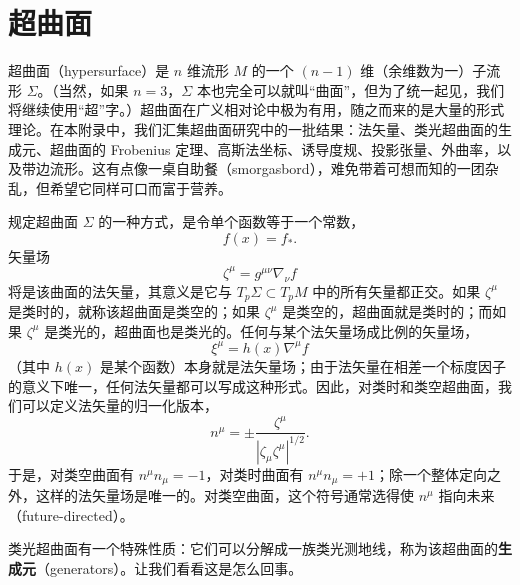 \chapter{超曲面}

超曲面（hypersurface）是 $n$ 维流形 $M$ 的一个 $(n-1)$ 维（余维数为一）子流形 $\Sigma$。（当然，如果 $n = 3$，$\Sigma$ 本也完全可以就叫“曲面”，但为了统一起见，我们将继续使用“超”字。）超曲面在广义相对论中极为有用，随之而来的是大量的形式理论。在本附录中，我们汇集超曲面研究中的一批结果：法矢量、类光超曲面的生成元、超曲面的 Frobenius 定理、高斯法坐标、诱导度规、投影张量、外曲率，以及带边流形。这有点像一桌自助餐（smorgasbord），难免带着可想而知的一团杂乱，但希望它同样可口而富于营养。

规定超曲面 $\Sigma$ 的一种方式，是令单个函数等于一个常数，
\begin{equation*}
f(x) = f_*.
\tag{D.1}
\end{equation*}
矢量场
\begin{equation*}
\zeta^\mu = g^{\mu\nu} \nabla_\nu f
\tag{D.2}
\end{equation*}
将是该曲面的法矢量，其意义是它与 $T_p\Sigma \subset T_pM$ 中的所有矢量都正交。如果 $\zeta^\mu$ 是类时的，就称该超曲面是类空的；如果 $\zeta^\mu$ 是类空的，超曲面就是类时的；而如果 $\zeta^\mu$ 是类光的，超曲面也是类光的。任何与某个法矢量场成比例的矢量场，
\begin{equation*}
\xi^\mu = h(x) \nabla^\mu f
\tag{D.3}
\end{equation*}
（其中 $h(x)$ 是某个函数）本身就是法矢量场；由于法矢量在相差一个标度因子的意义下唯一，任何法矢量都可以写成这种形式。因此，对类时和类空超曲面，我们可以定义法矢量的归一化版本，
\begin{equation*}
n^\mu = \pm \frac{\zeta^\mu}{|\zeta_\mu \zeta^\mu|^{1/2}}.
\tag{D.4}
\end{equation*}
于是，对类空曲面有 $n^\mu n_\mu = -1$，对类时曲面有 $n^\mu n_\mu = +1$；除一个整体定向之外，这样的法矢量场是唯一的。对类空曲面，这个符号通常选得使 $n^\mu$ 指向未来（future-directed）。

类光超曲面有一个特殊性质：它们可以分解成一族类光测地线，称为该超曲面的\textbf{生成元}（generators）。让我们看看这是怎么回事。

